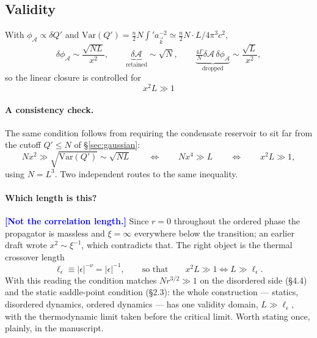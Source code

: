 \documentclass[11pt,a4paper]{article}
\newcommand{\bk}{\vec k}
\newcommand{\FLAG}[1]{\textcolor{blue}{\textbf{[#1]}}}
\newcommand{\Ac}{\mathcal{A}}
\newcommand{\bk}{\vec k}
\newcommand{\FLAG}[1]{\textcolor{blue}{\textbf{[#1]}}}
\begin{document}
\subsection{Validity}
\label{sec:validity}
With $\phi_{\Ac}\propto\delta Q'$ and
$\mathrm{Var}(Q')=\tfrac n2N\!\int'\!a_{\bk}^{-2}\simeq\tfrac n2N\cdot L/4\pi^3c^2$,
\begin{equation}
  \delta\phi_{\Ac}\sim\frac{\sqrt{NL}}{x^{2}},
  \qquad
  \underbrace{\delta\Ac}_{\text{retained}}\sim\sqrt N,
  \qquad
  \underbrace{\tfrac{4\Gamma}{N}\delta\Ac\,\delta\phi_{\Ac}}_{\text{dropped}}\sim\frac{\sqrt L}{x^{2}},
\end{equation}
so the linear closure is controlled for
\begin{equation}
  \boxed{\ x^{2}L\gg1\ }
\end{equation}
\paragraph{A consistency check.} The same condition follows from requiring the condensate
reservoir to sit far from the cutoff $Q'\le N$ of \S\ref{sec:gaussian}:
\begin{equation}
  Nx^{2}\gg\sqrt{\mathrm{Var}(Q')}\sim\sqrt{NL}
  \qquad\Longleftrightarrow\qquad
  Nx^{4}\gg L
  \qquad\Longleftrightarrow\qquad
  x^{2}L\gg1 ,
\end{equation}
using $N=L^3$. Two independent routes to the same inequality.

\paragraph{Which length is this?} \FLAG{Not the correlation length.} Since $r=0$ throughout
the ordered phase the propagator is massless and $\xi=\infty$ everywhere below the
transition; an earlier draft wrote $x^2\sim\xi^{-1}$, which contradicts that. The right
object is the thermal crossover length
\begin{equation}
  \ell_\epsilon\equiv|\epsilon|^{-\nu}=|\epsilon|^{-1},
  \qquad\text{so that}\qquad
  x^2L\gg1\iff L\gg\ell_\epsilon .
\end{equation}
With this reading the condition matches $Nr^{3/2}\gg1$ on the disordered side (\S4.4) and
the static saddle-point condition (\S2.3): the whole construction --- statics, disordered
dynamics, ordered dynamics --- has one validity domain, $L\gg\ell_\epsilon$, with the
thermodynamic limit taken before the critical limit. Worth stating once, plainly, in the
manuscript.
\end{document}

